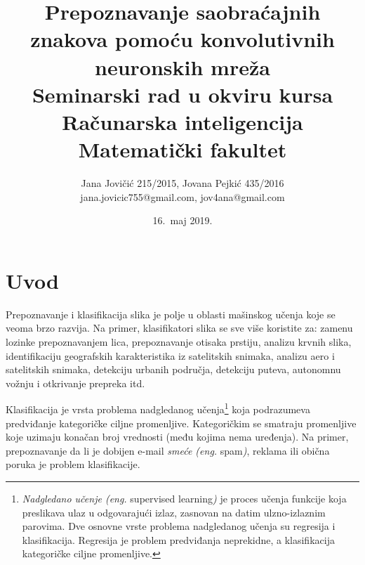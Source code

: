 \documentclass[a4paper]{article}
\begin{document}
\title{Prepoznavanje saobraćajnih znakova pomoću konvolutivnih neuronskih mreža\\ \small{Seminarski rad u okviru kursa\\Računarska inteligencija\\ Matematički fakultet}}

\author{Jana Jovičić 215/2015, Jovana Pejkić 435/2016 \\ jana.jovicic755@gmail.com, jov4ana@gmail.com}

\date{16.~maj 2019.}

\maketitle

\abstract{

}

\newpage

\tableofcontents

\newpage

\section{Uvod}
\label{sec:uvod}

Prepoznavanje i klasifikacija slika je polje u oblasti mašinskog učenja koje se veoma brzo razvija. Na primer, klasifikatori slika se sve više koristite za: zamenu lozinke prepoznavanjem lica, prepoznavanje otisaka prstiju, analizu krvnih slika, identifikaciju geografskih karakteristika iz satelitskih snimaka, analizu aero i satelitskih snimaka, detekciju urbanih područja, detekciju puteva, autonomnu vožnju i otkrivanje prepreka itd.

Klasifikacija je vrsta problema nadgledanog učenja\footnote{\textit{Nadgledano učenje (eng.} supervised learning\textit{)} je proces učenja funkcije koja preslikava ulaz u odgovarajući izlaz, zasnovan na datim ulzno-izlaznim parovima. Dve osnovne vrste problema nadgledanog učenja su regresija i klasifikacija. Regresija je problem predviđanja neprekidne, a klasifikacija kategoričke ciljne promenljive.} koja podrazumeva predviđanje kategoričke ciljne promenljive. Kategoričkim se smatraju promenljive koje uzimaju konačan broj vrednosti (među kojima nema uređenja). Na primer, prepoznavanje da li je dobijen e-mail \textit{smeće (eng.} spam\textit{)}, reklama ili obična poruka je problem klasifikacije.
\end{document}
